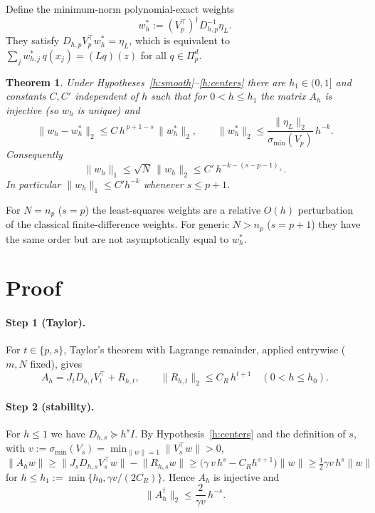 \documentclass[11pt]{article}
\newcommand{\Pol}[2]{\Pi_{#1}^{#2}}
\newcommand{\norm}[1]{\lVert #1\rVert}
\newcommand{\smin}{\sigma_{\min}}
\newcommand{\pinv}{\dagger}
\theoremstyle{plain}
\newtheorem{theorem}{Theorem}
\theoremstyle{definition}
\theoremstyle{remark}
\begin{document}
Define the minimum-norm polynomial-exact weights
\[
w_h^*:=(V_p^{\top})^{\pinv}D_{h,p}^{-1}\eta_L .
\]
They satisfy $D_{h,p}V_p^\top w_h^*=\eta_L$, which is equivalent to
$\sum_j w_{h,j}^*\,q(x_j)=(Lq)(z)$ for all $q\in\Pol{p}{d}$.

\begin{theorem}\label{thm:main}
Under Hypotheses~\ref{h:smooth}--\ref{h:centers} there are $h_1\in(0,1]$ and constants $C,C'$ independent of $h$ such that for $0<h\le h_1$ the matrix $A_h$ is injective (so $w_h$ is unique) and
\begin{equation}\label{eq:main}
\norm{w_h-w_h^*}_2\le C\,h^{\,p+1-s}\,\norm{w_h^*}_2,
\qquad
\norm{w_h^*}_2\le \frac{\norm{\eta_L}_2}{\smin(V_p)}\,h^{-k}.
\end{equation}
Consequently
\[
\norm{w_h}_1\le\sqrt N\,\norm{w_h}_2\le C'\,h^{-k-(s-p-1)_+}.
\]
In particular $\norm{w_h}_1\le C'h^{-k}$ whenever $s\le p+1$.
\end{theorem}

For $N=n_p$ ($s=p$) the least-squares weights are a relative $O(h)$ perturbation of the classical finite-difference weights.
For generic $N>n_p$ ($s=p+1$) they have the same order but are not asymptotically equal to $w_h^*$.

\section{Proof}

\paragraph{Step 1 (Taylor).}
For $t\in\{p,s\}$, Taylor's theorem with Lagrange remainder, applied entrywise ($m,N$ fixed), gives
\[
A_h=J_tD_{h,t}V_t^\top+R_{h,t},\qquad \norm{R_{h,t}}_2\le C_R\,h^{t+1}\quad(0<h\le h_0).
\]

\paragraph{Step 2 (stability).}
For $h\le 1$ we have $D_{h,s}\succeq h^sI$. By Hypothesis~\ref{h:centers} and the definition of $s$, with $v:=\smin(V_s)=\min_{\norm w=1}\norm{V_s^\top w}>0$,
\[
\norm{A_hw}\ge\norm{J_sD_{h,s}V_s^\top w}-\norm{R_{h,s}w}
\ge\big(\gamma\,v\,h^s-C_Rh^{s+1}\big)\norm w
\ge\tfrac12\gamma v\,h^s\norm w
\]
for $h\le h_1:=\min\{h_0,\gamma v/(2C_R)\}$. Hence $A_h$ is injective and
\[
\norm{A_h^\pinv}_2\le \frac{2}{\gamma v}\,h^{-s}.
\]
\end{document}

